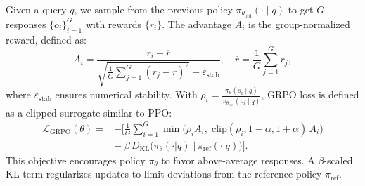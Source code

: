 Given a query $q$, we sample from the previous policy $\pi_{\theta_{\mathrm{old}}}(\cdot\!\mid q)$ to get $G$ responses $\{o_i\}_{i=1}^G$ with rewards $\{r_i\}$.
The advantage $A_i$ is the group-normalized reward, defined as:
\small
$$
A_i = \frac{r_i - \overline{r}}
     {\sqrt{\tfrac{1}{G}\sum_{j=1}^G (r_j - \overline{r})^2} + \varepsilon_{\mathrm{stab}}}, \quad \overline{r} = \frac{1}{G}\sum_{j=1}^G r_j,
$$
\normalsize
where $\varepsilon_{\mathrm{stab}}$ ensures numerical stability. 
With $\rho_i=\frac{\pi_{\theta}(o_i\!\mid q)}{\pi_{\theta_{\mathrm{old}}}(o_i\!\mid q)}$,
GRPO loss is defined as a clipped surrogate similar to PPO:
\small \begin{equation*}
\begin{aligned}
    \mathcal{L}_{\mathrm{GRPO}}(\theta)
 =&
-
[
\frac{1}{G}\sum_{i=1}^G
\min\!\bigl(\rho_i A_i,\;\!\!\mathrm{clip}(\rho_i,1-\alpha,1+\alpha)\,A_i\bigr) \\
& -\;\!\!\beta\,D_{\mathrm{KL}}\bigl(\pi_{\theta}(\cdot|q)\,\Vert\,\pi_{\mathrm{ref}}(\cdot|q)\bigr)
].
\end{aligned}    
\end{equation*}
\normalsize
This objective encourages policy $\pi_{\theta}$ to favor above-average responses.
A $\beta$-scaled KL term regularizes updates to limit deviations from the reference policy $\pi_{\mathrm{ref}}$.



